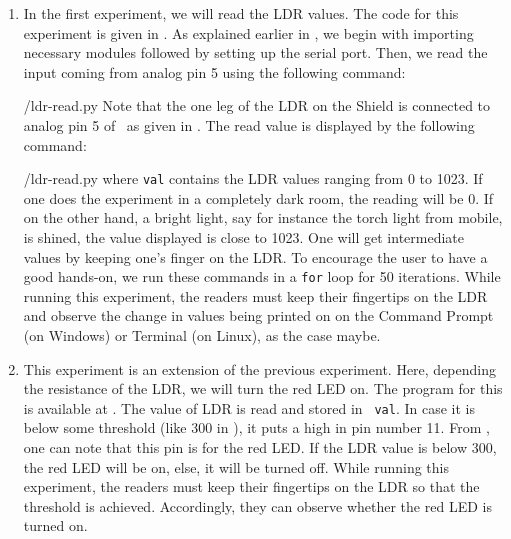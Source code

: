 \begin{enumerate}
  \item In the first experiment, we will read the LDR values. The code for this experiment is given in
        . As explained earlier in , we begin with 
        importing necessary modules followed by setting up the serial port. 
        Then, we read the input coming from analog pin 5 using the
        following command:
        
        {\LocLDRpycode/ldr-read.py} Note that the one leg of the LDR on
        the Shield is connected to analog pin 5 of \arduino\, 
        as given in . The read value is displayed 
        by the following command: 
        
        {\LocLDRpycode/ldr-read.py} where {\tt val} contains
        the LDR values ranging from 0 to 1023. If one does the experiment in a completely dark room, the
        reading will be 0. If on the other hand, a bright light, say for instance the torch
        light from mobile, is shined, the value displayed is close to 1023. One will get
        intermediate values by keeping one's finger on the LDR. To
        encourage the user to have a good hands-on, we run these commands in
        a {\tt for} loop for 50 iterations. While running this experiment, the readers must keep their fingertips on the LDR and
        observe the change in values being printed on on the
        Command Prompt (on Windows) or Terminal (on Linux), as the case maybe.
        
  \item This experiment is an extension of the previous experiment. Here, depending the resistance of the LDR, we will
        turn the red LED on.  The program for this is available at
        .  The value of LDR is read and stored in {\tt
            val}.  In case it is below some threshold (like 300 in ), 
        it puts a high in pin number 11.  From , 
        one can note that this pin is for the red LED.  If the LDR value is below 300, 
        the red LED will be on, else, it will be turned off.  
        While running this experiment, the readers 
        must keep their fingertips on the LDR so that the threshold is achieved. Accordingly, 
        they can observe whether the red LED is turned on. 
        
        
\end{enumerate}

